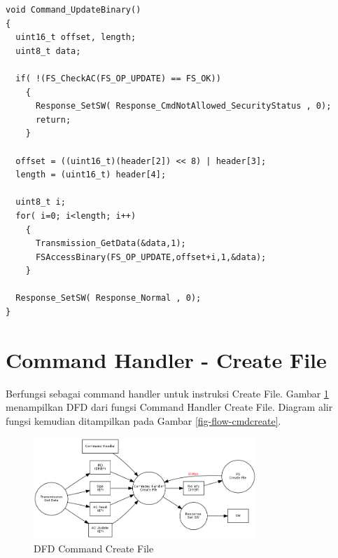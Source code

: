 \begin{lstlisting}[caption={Kode Program Fungsi Command Handler Update}, label={list-cmdupdate}]
void Command_UpdateBinary()
{
  uint16_t offset, length;
  uint8_t data;

  if( !(FS_CheckAC(FS_OP_UPDATE) == FS_OK))
    {
      Response_SetSW( Response_CmdNotAllowed_SecurityStatus , 0);
      return;
    }

  offset = ((uint16_t)(header[2]) << 8) | header[3];
  length = (uint16_t) header[4];

  uint8_t i;
  for( i=0; i<length; i++)
    {
      Transmission_GetData(&data,1);
      FSAccessBinary(FS_OP_UPDATE,offset+i,1,&data);
    }

  Response_SetSW( Response_Normal , 0);
}
\end{lstlisting}

\section{Command Handler - Create File}
\label{sec_cmdcreate}

Berfungsi sebagai command handler untuk instruksi Create File. Gambar \ref{fig-dfd-cmdcreate} menampilkan DFD dari fungsi Command Handler Create File. Diagram alir fungsi kemudian ditampilkan pada Gambar \ref{fig-flow-cmdcreate}. 

\begin{figure}[h]
\centering
\includegraphics[width=0.75\textwidth]{image/command/dfd_cmdcreate.png}
\caption{DFD Command Create File}
\label{fig-dfd-cmdcreate}
\end{figure}

